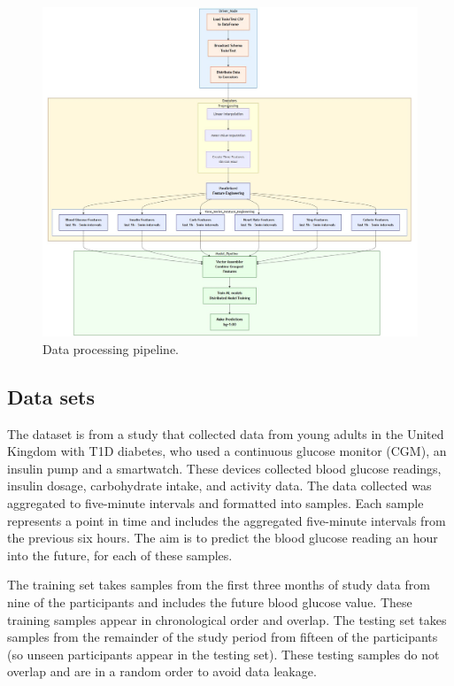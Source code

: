 \documentclass[
	a4paper, %
	10pt, %
	unnumberedsections, %
	twoside, %
]{LTJournalArticle}
\begin{document}
\begin{figure}
	\centering
	\includegraphics[width=1\linewidth]{./Figures/overview.jpg}
	\caption{Data processing pipeline.}
	\label{fig:dataprocessing}
\end{figure}

\subsection{Data sets}

The dataset is from a study that collected data from young adults in the United Kingdom with T1D diabetes, who used a continuous glucose monitor (CGM), an insulin pump and a smartwatch. These devices collected blood glucose readings, insulin dosage, carbohydrate intake, and activity data. The data collected was aggregated to five-minute intervals and formatted into samples. Each sample represents a point in time and includes the aggregated five-minute intervals from the previous six hours. The aim is to predict the blood glucose reading an hour into the future, for each of these samples.

The training set takes samples from the first three months of study data from nine of the participants and includes the future blood glucose value. These training samples appear in chronological order and overlap. The testing set takes samples from the remainder of the study period from fifteen of the participants (so unseen participants appear in the testing set). These testing samples do not overlap and are in a random order to avoid data leakage.
\end{document}
